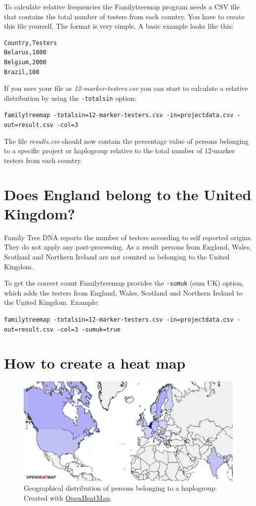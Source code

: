 \documentclass[12pt,a4paper]{article}
\begin{document}
To calculate relative frequencies the Familytreemap program
needs a CSV file that contains the total number of testers
from each country. You have to create this file yourself.
The format is very simple. A basic example looks like this:

\begin{verbatim}
Country,Testers
Belarus,1000
Belgium,2000
Brazil,100
\end{verbatim}

If you save your file as \emph{12-marker-testers.csv}
you can start to calculate a relative distribution by using
the \texttt{-totalsin} option:

\vspace{1ex}
\noindent
\texttt{familytreemap -totalsin=12-marker-testers.csv -in=projectdata.csv -out=result.csv -col=3}
\vspace{1ex}

\noindent
The file \emph{results.csv} should now contain the percentage
value of persons belonging to a specific project or haplogroup
relative to the total number of 12-marker testers from each country.


\section{Does England belong to the United Kingdom?}

Family Tree DNA reports the number of testers according to
self reported origins. They do not apply any post-processing.
As a result persons from England, Wales, Scotland and Northern
Ireland are not counted as belonging to the United Kingdom.

To get the correct count Familytreemap provides the 
\texttt{-sumuk} (sum UK) option, which adds the testers from
England, Wales, Scotland and Northern Ireland to the United
Kingdom. Example:

\vspace{1ex}
\noindent
\texttt{familytreemap -totalsin=12-marker-testers.csv -in=projectdata.csv -out=result.csv -col=3 -sumuk=true}


\section{How to create a heat map}

\begin{figure}[ht]
\centering
\includegraphics[width=13cm]{heatmap.png}
\caption{Geographical distribution of persons belonging
to a haplogroup. Created with \href{http://www.openheatmap.com/}{OpenHeatMap}.}
\end{figure}
\end{document}
